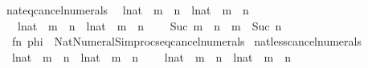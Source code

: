 \begin{isabellebody}
\isanewline
{}\isamarkupfalse%
\ nateq{\isacharunderscore}{\kern0pt}cancel{\isacharunderscore}{\kern0pt}numerals\isanewline
\ \ {\isacharparenleft}{\kern0pt}{\isachardoublequoteopen}{\isacharparenleft}{\kern0pt}l{\isacharcolon}{\kern0pt}{\isacharcolon}{\kern0pt}nat{\isacharparenright}{\kern0pt}\ {\isacharplus}{\kern0pt}\ m\ {\isacharequal}{\kern0pt}\ n{\isachardoublequoteclose}\ {\isacharbar}{\kern0pt}\ {\isachardoublequoteopen}{\isacharparenleft}{\kern0pt}l{\isacharcolon}{\kern0pt}{\isacharcolon}{\kern0pt}nat{\isacharparenright}{\kern0pt}\ {\isacharequal}{\kern0pt}\ m\ {\isacharplus}{\kern0pt}\ n{\isachardoublequoteclose}\ {\isacharbar}{\kern0pt}\isanewline
\ \ \ {\isachardoublequoteopen}{\isacharparenleft}{\kern0pt}l{\isacharcolon}{\kern0pt}{\isacharcolon}{\kern0pt}nat{\isacharparenright}{\kern0pt}\ {\isacharasterisk}{\kern0pt}\ m\ {\isacharequal}{\kern0pt}\ n{\isachardoublequoteclose}\ {\isacharbar}{\kern0pt}\ {\isachardoublequoteopen}{\isacharparenleft}{\kern0pt}l{\isacharcolon}{\kern0pt}{\isacharcolon}{\kern0pt}nat{\isacharparenright}{\kern0pt}\ {\isacharequal}{\kern0pt}\ m\ {\isacharasterisk}{\kern0pt}\ n{\isachardoublequoteclose}\ {\isacharbar}{\kern0pt}\isanewline
\ \ \ {\isachardoublequoteopen}Suc\ m\ {\isacharequal}{\kern0pt}\ n{\isachardoublequoteclose}\ {\isacharbar}{\kern0pt}\ {\isachardoublequoteopen}m\ {\isacharequal}{\kern0pt}\ Suc\ n{\isachardoublequoteclose}{\isacharparenright}{\kern0pt}\ {\isacharequal}{\kern0pt}\isanewline
\ \ {\isacartoucheopen}fn\ phi\ {\isacharequal}{\kern0pt}{\isachargreater}{\kern0pt}\ Nat{\isacharunderscore}{\kern0pt}Numeral{\isacharunderscore}{\kern0pt}Simprocs{\isachardot}{\kern0pt}eq{\isacharunderscore}{\kern0pt}cancel{\isacharunderscore}{\kern0pt}numerals{\isacartoucheclose}\isanewline
\isanewline
{}\isamarkupfalse%
\ natless{\isacharunderscore}{\kern0pt}cancel{\isacharunderscore}{\kern0pt}numerals\isanewline
\ \ {\isacharparenleft}{\kern0pt}{\isachardoublequoteopen}{\isacharparenleft}{\kern0pt}l{\isacharcolon}{\kern0pt}{\isacharcolon}{\kern0pt}nat{\isacharparenright}{\kern0pt}\ {\isacharplus}{\kern0pt}\ m\ {\isacharless}{\kern0pt}\ n{\isachardoublequoteclose}\ {\isacharbar}{\kern0pt}\ {\isachardoublequoteopen}{\isacharparenleft}{\kern0pt}l{\isacharcolon}{\kern0pt}{\isacharcolon}{\kern0pt}nat{\isacharparenright}{\kern0pt}\ {\isacharless}{\kern0pt}\ m\ {\isacharplus}{\kern0pt}\ n{\isachardoublequoteclose}\ {\isacharbar}{\kern0pt}\isanewline
\ \ \ {\isachardoublequoteopen}{\isacharparenleft}{\kern0pt}l{\isacharcolon}{\kern0pt}{\isacharcolon}{\kern0pt}nat{\isacharparenright}{\kern0pt}\ {\isacharasterisk}{\kern0pt}\ m\ {\isacharless}{\kern0pt}\ n{\isachardoublequoteclose}\ {\isacharbar}{\kern0pt}\ {\isachardoublequoteopen}{\isacharparenleft}{\kern0pt}l{\isacharcolon}{\kern0pt}{\isacharcolon}{\kern0pt}nat{\isacharparenright}{\kern0pt}\ {\isacharless}{\kern0pt}\ m\ {\isacharasterisk}{\kern0pt}\ n{\isachardoublequoteclose}\ {\isacharbar}{\kern0pt}\isanewline

\end{isabellebody}
